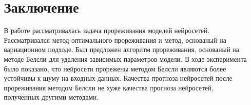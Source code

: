 \newpage

\section{Заключение}



В работе рассматривалась задача прореживания моделей нейросетей. Рассматривался метод оптимального прореживания и метод, основаный на вариационном подходе. Был предложен алгоритм прореживания, основаный на методе Белсли для удаления зависимых параметров модели. В ходе эксперимента было показано, что нейросети прорежены методом Белсли являются более устойчивы к шуму на входных данных. Качества прогноза нейросетей после прореживания методом Белсли не хуже качества прогноза нейросетей, полученных другими методами.
